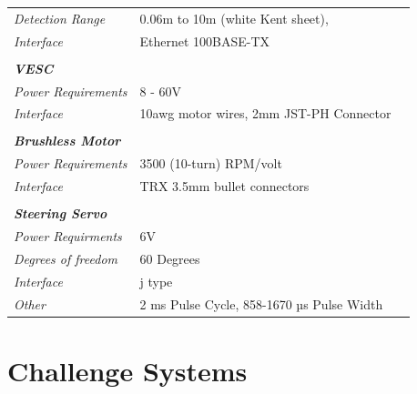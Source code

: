 \documentclass[]{article}
\begin{document}
\begin{table}[H]
\begin{tabular}{lll}
		\textit{Detection Range}          & 0.06m to 10m (white Kent sheet),                                 &  \\
		\textit{Interface}                & Ethernet 100BASE-TX                                              &  \\
		\textit{}                         &                                                                  &  \\
		\textit{\textbf{VESC}}            &                                                                  &  \\
		\textit{Power Requirements}       & 8 - 60V                                                          &  \\
		\textit{Interface}                & 10awg motor wires, 2mm JST-PH Connector                          &  \\
		\textit{}                         &                                                                  &  \\
		\textit{\textbf{Brushless Motor}} &                                                                  &  \\
		\textit{Power Requirements}       & 3500 (10-turn) RPM/volt                                          &  \\
		\textit{Interface}                & TRX 3.5mm bullet connectors                                      &  \\
		\textit{}                         &                                                                  &  \\
		\textit{\textbf{Steering Servo}}  &                                                                  &  \\
		\textit{Power Requirments}        & 6V                                                               &  \\
		\textit{Degrees of freedom}       & 60 Degrees                                                       &  \\
		\textit{Interface}                & j type                                                           &  \\
		\textit{Other}                    & 2 ms Pulse Cycle, 858-1670 µs Pulse Width                        & 
	\end{tabular}
\end{table}


\newpage
\section{Challenge Systems}
\end{document}
